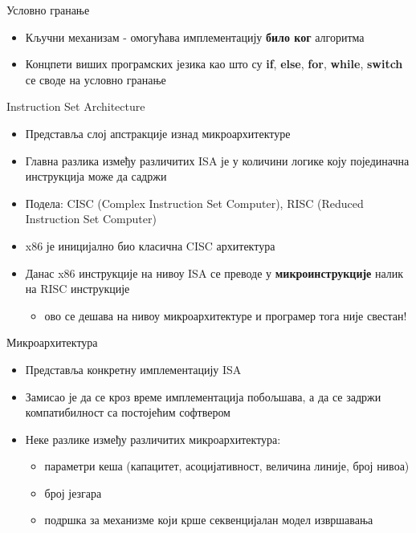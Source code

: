 \documentclass{beamer}
\begin{document}
    \begin{frame}{Условно гранање}
        \begin{itemize}
            \item Кључни механизам - омогућава имплементацију \textbf{било ког} алгоритма
            \item Концпети виших програмских језика као што су \textbf{if}, \textbf{else}, \textbf{for}, \textbf{while}, \textbf{switch} се своде на условно гранање
        \end{itemize}
    \end{frame}
    
    \begin{frame}{Instruction Set Architecture}
        \begin{itemize}
            \item Представља слој апстракције изнад микроархитектуре
            \item Главна разлика између различитих ISA је у количини логике коју појединачна инструкција може да садржи
            \item Подела: CISC (Complex Instruction Set Computer), RISC (Reduced Instruction Set Computer)
            \item x86 је иницијално био класична CISC архитектура
            \item Данас x86 инструкције на нивоу ISA се преводе у \textbf{микроинструкције} налик на RISC инструкције
            \begin{itemize}
                \item ово се дешава на нивоу микроархитектуре и програмер тога није свестан!
            \end{itemize}
        \end{itemize}
    \end{frame}
    
    \begin{frame}{Микроархитектура}
        \begin{itemize}
            \item Представља конкретну имплементацију ISA
            \item Замисао је да се кроз време имплементација побољшава, а да се задржи компатибилност са постојећим софтвером
            \item Неке разлике између различитих микроархитектура:
            \begin{itemize}
                \item параметри кеша (капацитет, асоцијативност, величина линије, број нивоа)
                \item број језгара
                \item подршка за механизме који крше секвенцијалан модел извршавања
            \end{itemize}
        \end{itemize}
    \end{frame}
    
\end{document}
